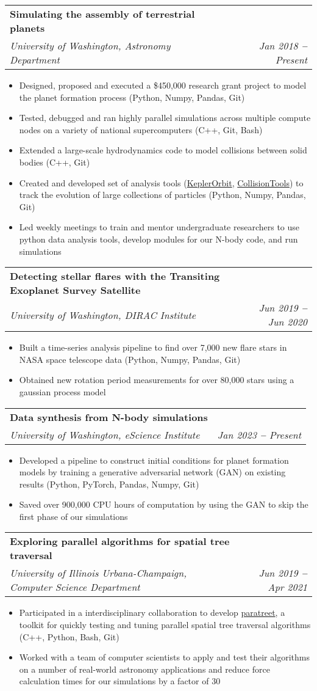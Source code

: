 \documentclass[letterpaper,11pt]{article}
\makeatletter
\newcommand{\resumeItem}[1]{
  \item\small{
    {#1 \vspace{-2pt}}
  }
}
\newcommand{\resumeSubheading}[4]{
  \vspace{-2pt}\item
    \begin{tabular*}{0.97\textwidth}[t]{l@{\extracolsep{\fill}}r}
      \textbf{#1} & #2 \\
      \textit{\small#3} & \textit{\small #4} \\
    \end{tabular*}\vspace{-7pt}
}
\newcommand{\resumeItemListStart}{\begin{itemize}}
\newcommand{\resumeItemListEnd}{\end{itemize}\vspace{-5pt}}
\makeatother
\begin{document}
    \resumeSubheading
      {Simulating the assembly of terrestrial planets}{}
      {University of Washington, Astronomy Department}{Jan 2018 \textbf{--} Present}
        \resumeItemListStart
        	    \resumeItem{Designed, proposed and executed a \$450,000 research grant project to model the planet formation process (Python, Numpy, Pandas, Git)}
            \resumeItem{Tested, debugged and ran highly parallel simulations across multiple compute nodes on a variety of national supercomputers (C++, Git, Bash)}
            \resumeItem{Extended a large-scale hydrodynamics code to model collisions between solid bodies (C++, Git)}
            \resumeItem{Created and developed set of analysis tools ({\sc \href{https://github.com/spencerw/CollisionTools}{KeplerOrbit}}, {\sc \href{https://github.com/spencerw/KeplerOrbit}{CollisionTools}}) to track the evolution of large collections of particles (Python, Numpy, Pandas, Git)}
            \resumeItem{Led weekly meetings to train and mentor undergraduate researchers to use python data analysis tools, develop modules for our N-body code, and run simulations}
        \resumeItemListEnd
    
    \resumeSubheading
      {Detecting stellar flares with the Transiting Exoplanet Survey Satellite}{}
      {University of Washington, DIRAC Institute}{Jun 2019 \textbf{--} Jun 2020}
        \resumeItemListStart
        	    \resumeItem{Built a time-series analysis pipeline to find over 7,000 new flare stars in NASA space telescope data (Python, Numpy, Pandas, Git)}
	    \resumeItem{Obtained new rotation period measurements for over 80,000 stars using a gaussian process model}
        \resumeItemListEnd
        
      \resumeSubheading
      {Data synthesis from N-body simulations}{}
      {University of Washington, eScience Institute}{Jan 2023 \textbf{--} Present}
        \resumeItemListStart
        	   \resumeItem{Developed a pipeline to construct initial conditions for planet formation models by training a generative adversarial network (GAN) on existing results (Python, PyTorch, Pandas, Numpy, Git)}
            \resumeItem{Saved over 900,000 CPU hours of computation by using the GAN to skip the first phase of our simulations}
        \resumeItemListEnd
        
        \resumeSubheading
      {Exploring parallel algorithms for spatial tree traversal}{}
      {University of Illinois Urbana-Champaign, Computer Science Department}{Jun 2019 \textbf{--} Apr 2021}
        \resumeItemListStart
            \resumeItem{Participated in a interdisciplinary collaboration to develop {\sc \href{https://paratreet.github.io/}{paratreet}}, a toolkit for quickly testing and tuning parallel spatial tree traversal algorithms (C++, Python, Bash, Git)}
            \resumeItem{Worked with a team of computer scientists to apply and test their algorithms on a number of real-world astronomy applications and reduce force calculation times for our simulations by a factor of 30}
        \resumeItemListEnd
        
\end{document}
